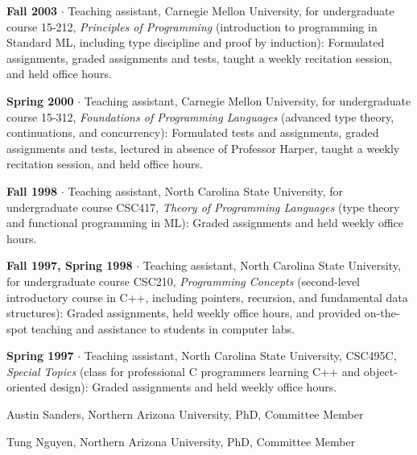 \documentclass[ComputerScience]{vita}
\begin{document}
\begin{vita}
\begin{Teaching}
   \item {\bf Fall 2003} $\cdot$ Teaching assistant, Carnegie Mellon
   University, for undergraduate course 15-212, \emph{Principles of
   Programming} (introduction to programming in Standard ML, including type
   discipline and proof by induction): Formulated assignments, graded
   assignments and tests, taught a weekly recitation session, and held
   office hours.

   \item {\bf Spring 2000} $\cdot$ Teaching assistant, Carnegie Mellon
   University, for undergraduate course 15-312, \emph{Foundations of
   Programming Languages} (advanced type theory, continuations, and concurrency): Formulated tests and assignments, graded
   assignments and tests, lectured in absence of Professor Harper,
   taught a weekly recitation session, and held office hours.

   \item {\bf Fall 1998} $\cdot$ Teaching assistant, North Carolina
   State University, for undergraduate course CSC417, \emph{Theory of
   Programming Languages} (type theory and functional programming in ML):
   Graded assignments and held weekly office hours.

   \item {\bf Fall 1997, Spring 1998} $\cdot$ Teaching assistant,
   North Carolina State University, for undergraduate course CSC210,
   {\em Programming Concepts} (second-level introductory course in
   C++, including pointers, recursion, and fundamental data
   structures): Graded assignments, held weekly office hours, and
   provided on-the-spot teaching and assistance to students in
   computer labs.

   \item {\bf Spring 1997} $\cdot$ Teaching assistant, North
   Carolina State University, CSC495C, {\em
   Special Topics} (class for professional C programmers learning C++ and object-oriented design):  Graded assignments and held weekly office
   hours.

\end{Teaching}

\begin{Current Students}
\item Austin Sanders, Northern Arizona University, PhD, Committee
  Member
  \item Tung Nguyen, Northern Arizona University, PhD, Committee Member
\end{Current Students}


\end{vita}
\end{document}
